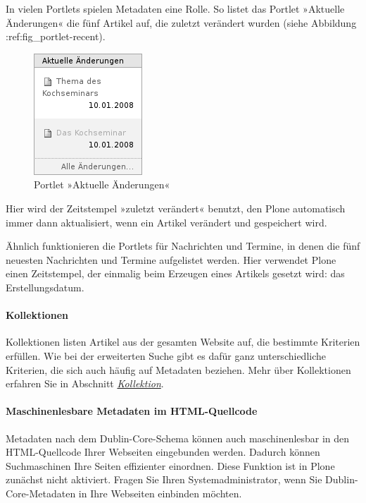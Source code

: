 \documentclass[a4paper,12pt,ngerman]{manual}
\begin{document}
In vielen Portlets spielen Metadaten eine Rolle. So listet das Portlet
»Aktuelle Änderungen« die fünf Artikel auf, die zuletzt verändert
wurden (siehe Abbildung :ref:fig\_portlet-recent).
\hypertarget{fig-portlet-recent}{}\begin{figure}[htbp]
\centering

\includegraphics{portlet-recent.png}
\caption{Portlet »Aktuelle Änderungen«}\end{figure}

Hier wird der Zeitstempel »zuletzt verändert« benutzt, den Plone
automatisch immer dann aktualisiert, wenn ein Artikel verändert und
gespeichert wird.

Ähnlich funktionieren die Portlets für Nachrichten und Termine, in denen die
fünf neuesten Nachrichten und Termine aufgelistet werden. Hier verwendet Plone
einen Zeitstempel, der einmalig beim Erzeugen eines Artikels gesetzt wird: das
Erstellungsdatum.
\hypertarget{sec-nutz-von-metad-4}{}

\paragraph{Kollektionen}

Kollektionen listen Artikel aus der gesamten Website auf, die bestimmte
Kriterien erfüllen. Wie bei der erweiterten Suche gibt es dafür ganz
unterschiedliche Kriterien, die sich auch häufig auf Metadaten beziehen.
Mehr über Kollektionen erfahren Sie in Abschnitt \hyperlink{sec-thema}{\emph{Kollektion}}.


\paragraph{Maschinenlesbare Metadaten im HTML-Quellcode}

Metadaten nach dem Dublin-Core-Schema können auch maschinenlesbar in den
HTML-Quellcode Ihrer Webseiten eingebunden werden. Dadurch können
Suchmaschinen Ihre Seiten effizienter einordnen. Diese Funktion ist
in Plone zunächst nicht aktiviert. Fragen Sie Ihren Systemadministrator,
wenn Sie Dublin-Core-Metadaten in Ihre Webseiten einbinden möchten.
\end{document}
